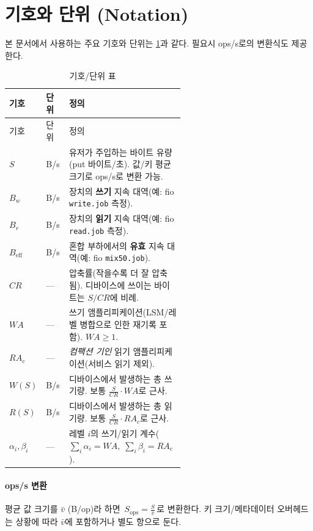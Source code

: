 \documentclass[11pt,a4paper]{article}
\begin{document}
\section{기호와 단위 (Notation)}
본 문서에서 사용하는 주요 기호와 단위는 \ref{tab:notation}과 같다.
필요시 ops/s로의 변환식도 제공한다.

\begin{longtable}{@{}l l p{0.57\linewidth}@{}}
    \caption{기호/단위 표}\label{tab:notation}\\
    \toprule
    기호 & 단위 & 정의 \\\midrule
    \endfirsthead
    \toprule
    기호 & 단위 & 정의 \\\midrule
    \endhead
    \(S\) & \si{B/s} & 유저가 주입하는 바이트 유량(put 바이트/초). 값/키 평균 크기로 ops/s로 변환 가능. \\
    \(B_w\) & \si{B/s} & 장치의 \textbf{쓰기} 지속 대역(예: fio \texttt{write.job} 측정). \\
    \(B_r\) & \si{B/s} & 장치의 \textbf{읽기} 지속 대역(예: fio \texttt{read.job} 측정). \\
    \(B_{\text{eff}}\) & \si{B/s} & 혼합 부하에서의 \textbf{유효} 지속 대역(예: fio \texttt{mix50.job}). \\
    \(CR\) & --- & 압축률(작을수록 더 잘 압축됨). 디바이스에 쓰이는 바이트는 \(S/CR\)에 비례. \\
    \(WA\) & --- & 쓰기 앰플리피케이션(LSM/레벨 병합으로 인한 재기록 포함). \(WA\ge1\). \\
    \(RA_c\) & --- & \emph{컴팩션 기인} 읽기 앰플리피케이션(서비스 읽기 제외). \\
    \(W(S)\) & \si{B/s} & 디바이스에서 발생하는 총 쓰기량. 보통 \(\frac{S}{CR}\cdot WA\)로 근사. \\
    \(R(S)\) & \si{B/s} & 디바이스에서 발생하는 총 읽기량. 보통 \(\frac{S}{CR}\cdot RA_c\)로 근사. \\
    \(\alpha_i,\beta_i\) & --- & 레벨 \(i\)의 쓰기/읽기 계수(\(\sum_i\alpha_i{=}WA,\;\sum_i\beta_i{=}RA_c\)). \\
    \bottomrule
\end{longtable}

\paragraph{ops/s 변환} 평균 값 크기를 \(\bar v\) (\si{B/op})라 하면
\(\,S_{\text{ops}}=\frac{S}{\bar v}\,\)로 변환한다.
키 크기/메타데이터 오버헤드는 상황에 따라 \(\bar v\)에 포함하거나 별도 항으로 둔다.
\end{document}

